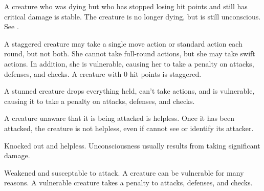  A creature who was dying but who has stopped losing hit points and still has critical damage is stable. The creature is no longer dying, but is still unconscious. See .

 A staggered creature may take a single move action or standard action each round, but not both. She cannot take full-round actions, but she may take swift actions. In addition, she is vulnerable, causing her to take a  penalty on attacks, defenses, and checks. A creature with 0 hit points is staggered.

 A stunned creature drops everything held, can't take actions, and is vulnerable, causing it to take a  penalty on attacks, defenses, and checks.

 A creature unaware that it is being attacked is helpless. Once it has been attacked, the creature is not helpless, even if cannot see or identify its attacker.

 Knocked out and helpless. Unconsciousness usually results from taking significant damage. 

 Weakened and susceptable to attack. A creature can be vulnerable for many reasons. A vulnerable creature takes a  penalty to attacks, defenses, and checks.
